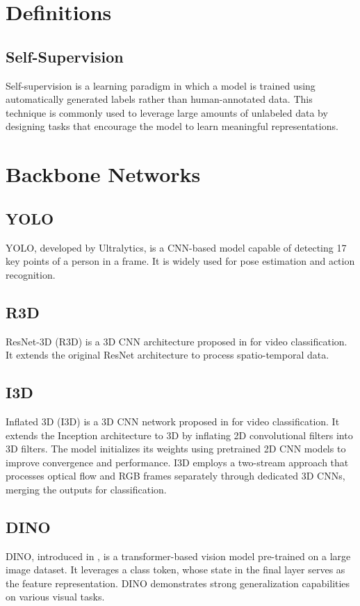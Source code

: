 \twocolumn
\newpage
\appendix

\section{Definitions}

\subsection{Self-Supervision}
Self-supervision is a learning paradigm in which a model is trained using automatically generated labels rather than human-annotated data. This technique is commonly used to leverage large amounts of unlabeled data by designing tasks that encourage the model to learn meaningful representations.

\section{Backbone Networks}

\subsection*{YOLO}
YOLO, developed by Ultralytics, is a CNN-based model capable of detecting 17 key points of a person in a frame. It is widely used for pose estimation and action recognition.

\subsection*{R3D}
ResNet-3D (R3D) is a 3D CNN architecture proposed in \cite{resnet-3d} for video classification. It extends the original ResNet architecture to process spatio-temporal data.

\subsection*{I3D}
Inflated 3D (I3D) is a 3D CNN network proposed in \cite{i3d} for video classification. It extends the Inception architecture to 3D by inflating 2D convolutional filters into 3D filters. The model initializes its weights using pretrained 2D CNN models to improve convergence and performance. I3D employs a two-stream approach that processes optical flow and RGB frames separately through dedicated 3D CNNs, merging the outputs for classification.

\subsection*{DINO}
DINO, introduced in \cite{dinov2}, is a transformer-based vision model pre-trained on a large image dataset. It leverages a class token, whose state in the final layer serves as the feature representation. DINO demonstrates strong generalization capabilities on various visual tasks.

